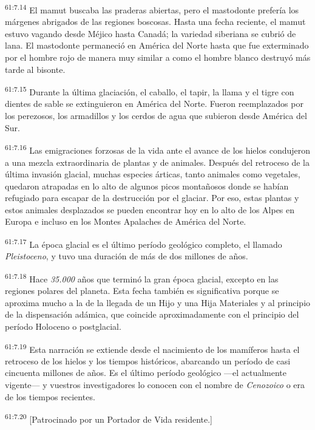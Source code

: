 \par
\textsuperscript{61:7.14} El mamut buscaba las praderas abiertas, pero el mastodonte prefería los márgenes abrigados de las regiones boscosas. Hasta una fecha reciente, el mamut estuvo vagando desde Méjico hasta Canadá; la variedad siberiana se cubrió de lana. El mastodonte permaneció en América del Norte hasta que fue exterminado por el hombre rojo de manera muy similar a como el hombre blanco destruyó más tarde al bisonte.

\par
\textsuperscript{61:7.15} Durante la última glaciación, el caballo, el tapir, la llama y el tigre con dientes de sable se extinguieron en América del Norte. Fueron reemplazados por los perezosos, los armadillos y los cerdos de agua que subieron desde América del Sur.

\par
\textsuperscript{61:7.16} Las emigraciones forzosas de la vida ante el avance de los hielos condujeron a una mezcla extraordinaria de plantas y de animales. Después del retroceso de la última invasión glacial, muchas especies árticas, tanto animales como vegetales, quedaron atrapadas en lo alto de algunos picos montañosos donde se habían refugiado para escapar de la destrucción por el glaciar. Por eso, estas plantas y estos animales desplazados se pueden encontrar hoy en lo alto de los Alpes en Europa e incluso en los Montes Apalaches de América del Norte.

\par
\textsuperscript{61:7.17} La época glacial es el último período geológico completo, el llamado \textit{Pleistoceno}, y tuvo una duración de más de dos millones de años.

\par
\textsuperscript{61:7.18} Hace \textit{35.000} años que terminó la gran época glacial, excepto en las regiones polares del planeta. Esta fecha también es significativa porque se aproxima mucho a la de la llegada de un Hijo y una Hija Materiales y al principio de la dispensación adámica, que coincide aproximadamente con el principio del período Holoceno o postglacial.

\par
\textsuperscript{61:7.19} Esta narración se extiende desde el nacimiento de los mamíferos hasta el retroceso de los hielos y los tiempos históricos, abarcando un período de casi cincuenta millones de años. Es el último período geológico ---el actualmente vigente--- y vuestros investigadores lo conocen con el nombre de \textit{Cenozoico} o era de los tiempos recientes.

\par
\textsuperscript{61:7.20} [Patrocinado por un Portador de Vida residente.]